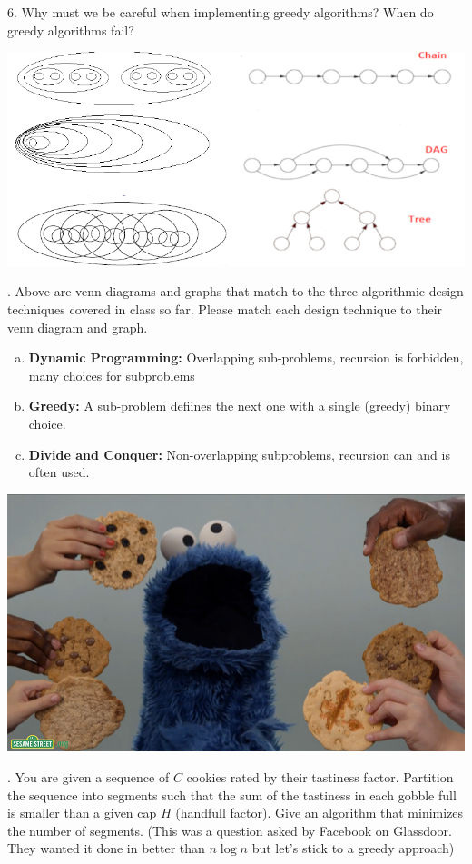 \documentclass[12pt]{article}
\begin{document}
6. Why must we be careful when implementing greedy algorithms? When do greedy algorithms fail?
\newpage
\centerline{\includegraphics[scale = 2]{prob3.jpg}}
. Above are venn diagrams and graphs that match to the three algorithmic design techniques covered in class so far. 
Please match each design technique to their venn diagram and graph.
\begin{enumerate}[a)]
    \item \textbf{Dynamic Programming:} Overlapping sub-problems, recursion is forbidden, many choices for subproblems
    \item \textbf{Greedy:} A sub-problem defiines the next one with a single (greedy) binary choice.
    \item \textbf{Divide and Conquer:} Non-overlapping subproblems, recursion can and is often used.
\end{enumerate}
\newpage
\centerline{\includegraphics[width=\textwidth]{cookies.jpg}}
. You are given a sequence of $C$ cookies rated by their tastiness factor. Partition the sequence into segments such that the sum of the tastiness in each gobble full is smaller than a given cap $H$ (handfull factor). Give an algorithm that minimizes the number of segments. (This was a question asked by Facebook on Glassdoor. They wanted it done in better than $n \log{n}$ but let's stick to a greedy approach)
\end{document}
